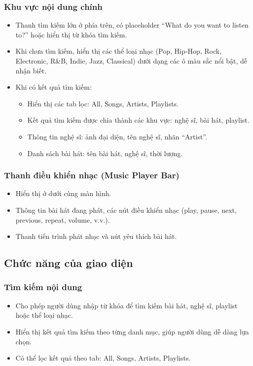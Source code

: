 \documentclass{book}
\begin{document}
\subsubsection{Khu vực nội dung chính}
\begin{itemize}
    \item Thanh tìm kiếm lớn ở phía trên, có placeholder “What do you want to listen to?” hoặc hiển thị từ khóa tìm kiếm.
    \item Khi chưa tìm kiếm, hiển thị các thể loại nhạc (Pop, Hip-Hop, Rock, Electronic, R\&B, Indie, Jazz, Classical) dưới dạng các ô màu sắc nổi bật, dễ nhận biết.
    \item Khi có kết quả tìm kiếm:
    \begin{itemize}
        \item Hiển thị các tab lọc: All, Songs, Artists, Playlists.
        \item Kết quả tìm kiếm được chia thành các khu vực: nghệ sĩ, bài hát, playlist.
        \item Thông tin nghệ sĩ: ảnh đại diện, tên nghệ sĩ, nhãn “Artist”.
        \item Danh sách bài hát: tên bài hát, nghệ sĩ, thời lượng.
    \end{itemize}
\end{itemize}

\subsubsection{Thanh điều khiển nhạc (Music Player Bar)}
\begin{itemize}
    \item Hiển thị ở dưới cùng màn hình.
    \item Thông tin bài hát đang phát, các nút điều khiển nhạc (play, pause, next, previous, repeat, volume, v.v.).
    \item Thanh tiến trình phát nhạc và nút yêu thích bài hát.
\end{itemize}

\subsection{Chức năng của giao diện}

\subsubsection{Tìm kiếm nội dung}
\begin{itemize}
    \item Cho phép người dùng nhập từ khóa để tìm kiếm bài hát, nghệ sĩ, playlist hoặc thể loại nhạc.
    \item Hiển thị kết quả tìm kiếm theo từng danh mục, giúp người dùng dễ dàng lựa chọn.
    \item Có thể lọc kết quả theo tab: All, Songs, Artists, Playlists.
\end{itemize}
\end{document}
